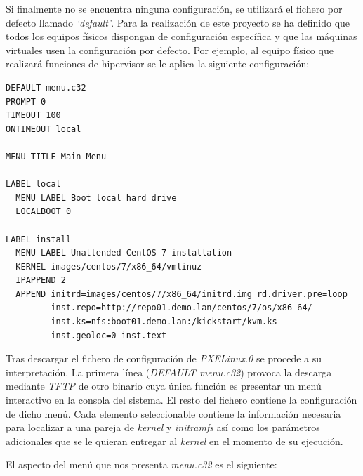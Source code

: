 \documentclass[a4paper,12pt,spanish,final]{epsc_tfc_pfc}
\begin{document}
Si finalmente no se encuentra ninguna configuración, se utilizará el fichero por defecto llamado \emph{`default'}. Para la realización de este proyecto se ha definido que todos los equipos físicos dispongan de configuración específica y que las máquinas virtuales usen la configuración por defecto. Por ejemplo, al equipo físico que realizará funciones de hipervisor se le aplica la siguiente configuración:\\

\begin{lstlisting}[style=dnsmasq]
DEFAULT menu.c32
PROMPT 0
TIMEOUT 100
ONTIMEOUT local

MENU TITLE Main Menu

LABEL local
  MENU LABEL Boot local hard drive
  LOCALBOOT 0

LABEL install
  MENU LABEL Unattended CentOS 7 installation
  KERNEL images/centos/7/x86_64/vmlinuz
  IPAPPEND 2
  APPEND initrd=images/centos/7/x86_64/initrd.img rd.driver.pre=loop
         inst.repo=http://repo01.demo.lan/centos/7/os/x86_64/
         inst.ks=nfs:boot01.demo.lan:/kickstart/kvm.ks
         inst.geoloc=0 inst.text
\end{lstlisting}

Tras descargar el fichero de configuración de \emph{PXELinux.0} se procede a su interpretación. La primera línea (\emph{DEFAULT menu.c32}) provoca la descarga mediante \emph{TFTP} de otro binario cuya única función es presentar un menú interactivo en la consola del sistema. El resto del fichero contiene la configuración de dicho menú. Cada elemento seleccionable contiene la información necesaria para localizar a una pareja de \emph{kernel} y \emph{initramfs} así como los parámetros adicionales que se le quieran entregar al \emph{kernel} en el momento de su ejecución.

El aspecto del menú que nos presenta \emph{menu.c32} es el siguiente:\\
\end{document}
